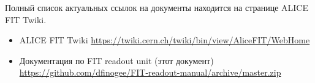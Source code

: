 \documentclass{article}
\begin{document}
Полный список актуальных ссылок на документы находится на странице  ALICE FIT Twiki.

\begin{itemize}
\item ALICE FIT Twiki
\url {https://twiki.cern.ch/twiki/bin/view/AliceFIT/WebHome}

\item Документация по FIT readout unit (этот документ)
\url{https://github.com/dfinogee/FIT-readout-manual/archive/master.zip}

\end{itemize}
\end{document}
